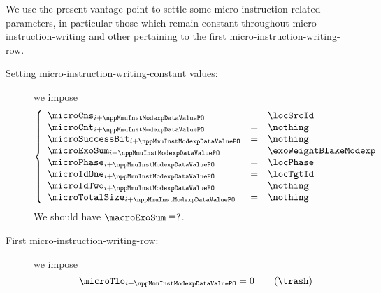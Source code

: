 \begin{center}
\end{center}
We use the present vantage point to settle some micro-instruction related parameters, in particular those which remain constant throughout micro-instruction-writing and other pertaining to the first micro-instruction-writing-row. 
\begin{description}
	\item[\underline{Setting micro-instruction-writing-constant values:}]
		we impose
		\[ \left\{ \begin{array}{lcl}		
			\microCns         _{i + \nppMmuInstModexpDataValuePO} & = & \locSrcId \\
			\microCnt         _{i + \nppMmuInstModexpDataValuePO} & = & \nothing  \\
			\microSuccessBit  _{i + \nppMmuInstModexpDataValuePO} & = & \nothing \\
			\microExoSum      _{i + \nppMmuInstModexpDataValuePO} & = & \exoWeightBlakeModexp \\
			\microPhase       _{i + \nppMmuInstModexpDataValuePO} & = & \locPhase  \\
			\microIdOne       _{i + \nppMmuInstModexpDataValuePO} & = & \locTgtId  \\
			\microIdTwo       _{i + \nppMmuInstModexpDataValuePO} & = & \nothing   \\
			\microTotalSize   _{i + \nppMmuInstModexpDataValuePO} & = & \nothing \\
		\end{array} \right.
		\]
		\saNote{} We should have
		$\macroExoSum \equiv ?$.
	\item[\underline{First micro-instruction-writing-row:}] \label{mmu: instructions: modexpdata: initialize: tlo is initially 0}
		we impose
		\[
			\microTlo_{i + \nppMmuInstModexpDataValuePO} = 0 \qquad(\trash)
		\]
\end{description} 
